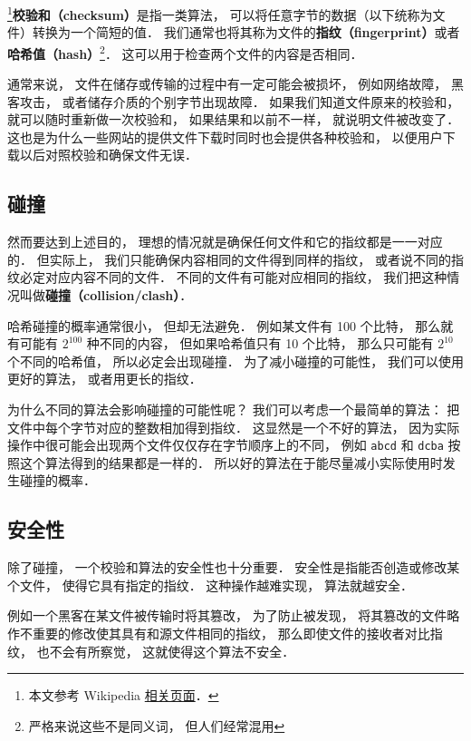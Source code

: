
\begin{issues}
\end{issues}

\footnote{本文参考 Wikipedia \href{https://en.wikipedia.org/wiki/Checksum}{相关页面}．}\textbf{校验和（checksum）}是指一类算法， 可以将任意字节的数据（以下统称为文件）转换为一个简短的值． 我们通常也将其称为文件的\textbf{指纹（fingerprint）}或者\textbf{哈希值（hash）}\footnote{严格来说这些不是同义词， 但人们经常混用}． 这可以用于检查两个文件的内容是否相同． %

通常来说， 文件在储存或传输的过程中有一定可能会被损坏， 例如网络故障， 黑客攻击， 或者储存介质的个别字节出现故障． 如果我们知道文件原来的校验和， 就可以随时重新做一次校验和， 如果结果和以前不一样， 就说明文件被改变了． 这也是为什么一些网站的提供文件下载时同时也会提供各种校验和， 以便用户下载以后对照校验和确保文件无误．

\subsection{碰撞}
然而要达到上述目的， 理想的情况就是确保任何文件和它的指纹都是一一对应的． 但实际上， 我们只能确保内容相同的文件得到同样的指纹， 或者说不同的指纹必定对应内容不同的文件． 不同的文件有可能对应相同的指纹， 我们把这种情况叫做\textbf{碰撞（collision/clash）}．

哈希碰撞的概率通常很小， 但却无法避免． 例如某文件有 100 个比特， 那么就有可能有 $2^{100}$ 种不同的内容， 但如果哈希值只有 10 个比特， 那么只可能有 $2^{10}$ 个不同的哈希值， 所以必定会出现碰撞． 为了减小碰撞的可能性， 我们可以使用更好的算法， 或者用更长的指纹．

为什么不同的算法会影响碰撞的可能性呢？ 我们可以考虑一个最简单的算法： 把文件中每个字节对应的整数相加得到指纹． 这显然是一个不好的算法， 因为实际操作中很可能会出现两个文件仅仅存在字节顺序上的不同， 例如 \verb|abcd| 和 \verb|dcba| 按照这个算法得到的结果都是一样的． 所以好的算法在于能尽量减小实际使用时发生碰撞的概率．

\subsection{安全性}
除了碰撞， 一个校验和算法的安全性也十分重要． 安全性是指能否创造或修改某个文件， 使得它具有指定的指纹． 这种操作越难实现， 算法就越安全．

例如一个黑客在某文件被传输时将其篡改， 为了防止被发现， 将其篡改的文件略作不重要的修改使其具有和源文件相同的指纹， 那么即使文件的接收者对比指纹， 也不会有所察觉， 这就使得这个算法不安全．

